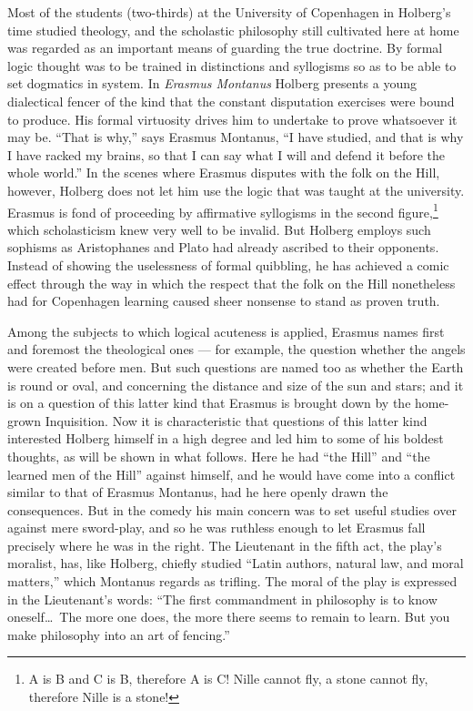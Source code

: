 \documentclass[12pt,a4paper]{book}
\newcommand{\opage}[1]{\marginnote{\footnotesize\textit{[#1]}}}
\begin{document}
Most of the students (two-thirds) at the University of Copenhagen in Holberg's
time studied theology, and the scholastic philosophy still cultivated here at
home was regarded as an important means of guarding the true doctrine. By formal
logic thought was to be trained in distinctions and syllogisms so as to be able
to set dogmatics in system. In \emph{Erasmus Montanus} Holberg presents a young
dialectical fencer of the kind that the constant disputation exercises were bound
to produce. His formal virtuosity drives him to undertake to prove whatsoever it
may be. ``That is why,'' says Erasmus Montanus, ``I have studied, and that is why
I have racked my brains, so that I can say what I will and defend it before the
whole world.'' In the scenes where Erasmus disputes with the folk on the Hill,
however, Holberg does not let him use the logic that was taught at the
university. Erasmus is fond of proceeding by affirmative syllogisms in the second
figure,\footnote{A is B and C is B, therefore A is C! Nille cannot fly, a stone
cannot fly, therefore Nille is a stone!} which scholasticism knew very well to be
invalid. But Holberg employs such sophisms as Aristophanes and Plato had already
ascribed to their opponents. Instead of showing the uselessness of formal
quibbling, he has achieved a comic effect through the way in which the respect
that the folk on the Hill nonetheless had for Copenhagen learning caused sheer
nonsense to stand as proven truth.

Among the subjects to which logical acuteness is applied, Erasmus names first and
foremost the theological ones --- for example, the question whether the angels
were created before men. But such questions are named too as whether the Earth is
round or oval, and concerning the distance and size of the sun and stars; and it
is on a question of this \opage{8}latter kind that Erasmus is brought down by the
home-grown Inquisition. Now it is characteristic that questions of this latter
kind interested Holberg himself in a high degree and led him to some of his
boldest thoughts, as will be shown in what follows. Here he had ``the Hill'' and
``the learned men of the Hill'' against himself, and he would have come into a
conflict similar to that of Erasmus Montanus, had he here openly drawn the
consequences. But in the comedy his main concern was to set useful studies over
against mere sword-play, and so he was ruthless enough to let Erasmus fall
precisely where he was in the right. The Lieutenant in the fifth act, the play's
moralist, has, like Holberg, chiefly studied ``Latin authors, natural law, and
moral matters,'' which Montanus regards as trifling. The moral of the play is
expressed in the Lieutenant's words: ``The first commandment in philosophy is to
know oneself\ldots\ The more one does, the more there seems to remain to learn.
But you make philosophy into an art of fencing.''
\end{document}
